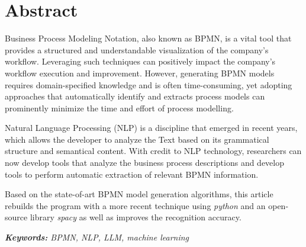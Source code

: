 \chapter*{Abstract}
\noindent
Business Process Modeling Notation, also known as BPMN, is a vital tool that provides a structured and understandable visualization of the company's workflow. Leveraging such techniques can positively impact the company's workflow execution and improvement. However, generating BPMN models requires domain-specified knowledge and is often time-consuming, yet adopting approaches that automatically identify and extracts process models can prominently minimize the time and effort of process modelling.

Natural Language Processing (NLP) is a discipline that emerged in recent years, which allows the developer to analyze the Text based on its grammatical structure and semantical content. With credit to NLP technology, researchers can now develop tools that analyze the business process descriptions and develop tools to perform automatic extraction of relevant BPMN information.

Based on the state-of-art BPMN model generation algorithms, this article rebuilds the program with a more recent technique using \textit{python} and an open-source library \textit{spacy} as well as improves the recognition accuracy.



\textit{\textbf{Keywords: }BPMN, NLP, LLM, machine learning}
